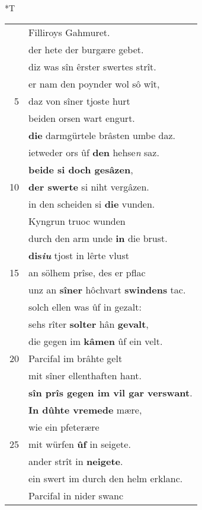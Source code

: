 \documentclass[8pt,a4paper,notitlepage]{article}
\begin{document}
\begin{table}[ht]
\begin{minipage}[t]{0.5\linewidth}
\end{minipage}
\hspace{0.5cm}
\begin{minipage}[t]{0.5\linewidth}
\small
\begin{center}*T
\end{center}
\begin{tabular}{rl}
 & Filliroys Gahmuret.\\ 
 & der hete der burgære gebet.\\ 
 & diz was sîn êrster swertes strît.\\ 
 & er nam den poynder wol sô wît,\\ 
5 & daz von sîner tjoste hurt\\ 
 & beiden orsen wart engurt.\\ 
 & \textbf{die} darmgürtele brâsten umbe daz.\\ 
 & ietweder ors ûf \textbf{den} hehse\textit{n} saz.\\ 
 & \textbf{beide si doch gesâzen},\\ 
10 & \textbf{der swerte} si niht vergâzen.\\ 
 & in den scheiden si \textbf{die} vunden.\\ 
 & Kyngrun truoc wunden\\ 
 & durch den arm unde \textbf{in} die brust.\\ 
 & \textbf{dis\textit{iu}} tjost in lêrte vlust\\ 
15 & an sölhem prîse, des er pflac\\ 
 & unz an \textbf{sîner} hôchvart \textbf{swindens} tac.\\ 
 & solch ellen was ûf in gezalt:\\ 
 & sehs rîter \textbf{solter} hân \textbf{gevalt},\\ 
 & die gegen im \textbf{kâmen} ûf ein velt.\\ 
20 & Parcifal im brâhte gelt\\ 
 & mit sîner ellenthaften hant.\\ 
 & \textbf{sîn prîs gegen im vil gar verswant}.\\ 
 & \textbf{In dûhte vremede} mære,\\ 
 & wie ein pfeterære\\ 
25 & mit würfen \textbf{ûf} in seigete.\\ 
 & ander strît in \textbf{neigete}.\\ 
 & ein swert im durch den helm erklanc.\\ 
 & Parcifal in nider swanc\\ 

\end{tabular}
\end{minipage}
\end{table}
\end{document}
